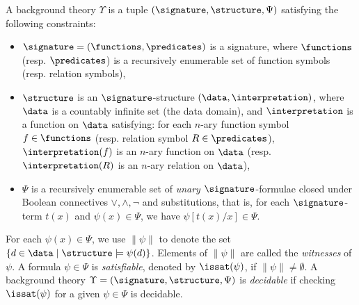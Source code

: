  
 \begin{definition}
A background theory $\Upsilon$ is a tuple $(\signature, \structure, \Psi)$ satisfying the following constraints:
\begin{itemize}
\item $\signature=(\functions, \predicates)$ is a signature, where $\functions$ (resp. $\predicates$) is a recursively enumerable set of function symbols (resp. relation symbols), 
%

\item $\structure$ is an $\signature$-structure $(\data, \interpretation)$, where $\data$ is a countably infinite set (the data domain), and $\interpretation$ is a function on $\data$ satisfying: for each $n$-ary function symbol $f \in \functions$ (resp. relation symbol $R \in \predicates$), $\interpretation(f)$ is an $n$-ary function on $\data$ (resp. $\interpretation(R)$ is an $n$-ary relation on $\data$),
%
\item $\Psi$ is a recursively enumerable set of \emph{unary} $\signature$-formulae closed under Boolean connectives $\vee, \wedge, \neg$ and substitutions, that is, for each $\signature$-term $t(x)$ and $\psi(x) \in \Psi$, we have $\psi[t(x)/x] \in \Psi$. 
\end{itemize}
%
For each $\psi(x) \in \Psi$, we use $\|\psi\|$ to denote the set $\{d \in \data \mid  \structure \models \psi(d)\}$. Elements of $\| \psi\|$ are called the \emph{witnesses} of $\psi$.
A formula $\psi \in \Psi$ is \emph{satisfiable}, denoted by $\issat(\psi)$, if $\|\psi\| \neq \emptyset$. A background theory $\Upsilon = (\signature, \structure, \Psi)$ is \emph{decidable} if  checking  $\issat(\psi)$ for a  given $\psi \in\Psi$ is decidable.
\end{definition}


